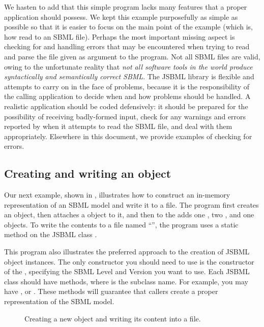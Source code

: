 We hasten to add that this simple program lacks many features that a proper
application should possess.  We kept this example purposefully as simple as
possible so that it is easier to focus on the main point of the example
(which is, how read to an SBML file).  Perhaps the most important missing
aspect is checking for and handling errors that may be encountered when
trying to read and parse the file given as argument to the program.  Not
all SBML files are valid, owing to the unfortunate reality that \emph{not
  all software tools in the world produce syntactically and semantically
  correct SBML}. The JSBML library is flexible and attempts to carry on in
the face of problems, because it is the responsibility of the calling
application to decide when and how problems should be handled. A realistic
application should be coded defensively: it should be prepared for the
possibility of receiving badly-formed input, check for any warnings and
errors reported by \SBMLReader when it attempts to read the SBML file, and
deal with them appropriately. Elsewhere in this document, we provide
examples of checking for errors.



\subsection{Creating and writing an  object}

Our next example, shown in ,
illustrates how to construct an in-memory representation of an SBML model
and write it to a file. The program first creates an \SBMLDocument object,
then attaches a \Model object to it, and then to the \Model adds one
\Compartment, two \Species, and one \Reaction objects. To write the
contents to a file named ``'', the program uses a static
method on the JSBML class \SBMLWriter. 

This program also illustrates the preferred approach to the creation of JSBML object instances. 
The only constructor you should need to use is the constructor of the \SBMLDocument, specifying
the SBML Level and Version you want to use. Each JSBML class should have  
 methods, where  is the subclass name. 
For example, you may have , 
or . These methods will guarantee that callers create a proper
representation of the SBML model.  

\begin{figure}[bht]
  \vspace*{-1ex}
  \vspace*{-1.5ex}
  \caption{Creating a new  object and writing its content
    into a file.}
  \label{fig:JSBMLexample-source}
  \vspace*{-1em}
\end{figure}
